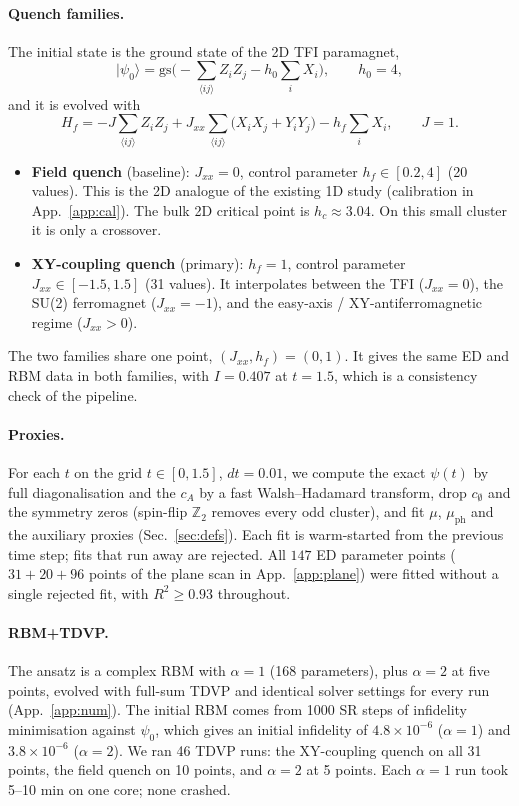 \documentclass[11pt,a4paper]{article}
\newcommand{\inff}{I}
\begin{document}
\paragraph{Quench families.}
The initial state is the ground state of the 2D TFI paramagnet,
\begin{equation}
  |\psi_0\rangle = \mathrm{gs}\Big(-\sum_{\langle ij\rangle} Z_iZ_j - h_0\sum_i X_i\Big),\qquad h_0=4,
\end{equation}
and it is evolved with
\begin{equation}
  H_f = -J\sum_{\langle ij\rangle} Z_iZ_j + J_{xx}\sum_{\langle ij\rangle}\big(X_iX_j+Y_iY_j\big) - h_f\sum_i X_i,\qquad J=1 .
\end{equation}
\begin{itemize}
  \item \textbf{Field quench} (baseline): $J_{xx}=0$, control parameter $h_f\in[0.2,4]$ (20 values).
    This is the 2D analogue of the existing 1D study (calibration in App.~\ref{app:cal}). The bulk 2D critical point is $h_c\approx3.04$.
    On this small cluster it is only a crossover.
  \item \textbf{XY-coupling quench} (primary): $h_f=1$, control parameter $J_{xx}\in[-1.5,1.5]$ (31 values).
    It interpolates between the TFI ($J_{xx}=0$), the SU(2) ferromagnet ($J_{xx}=-1$), and the
    easy-axis / XY-antiferromagnetic regime ($J_{xx}>0$).
\end{itemize}
The two families share one point, $(J_{xx},h_f)=(0,1)$. It gives the same ED and RBM data in both
families, with $\inff = 0.407$ at $t=1.5$, which is a consistency check of the pipeline.

\paragraph{Proxies.}
For each $t$ on the grid $t\in[0,1.5]$, $dt=0.01$, we compute the exact $\psi(t)$ by full diagonalisation and the
$c_A$ by a fast Walsh--Hadamard transform, drop $c_\emptyset$ and the symmetry zeros (spin-flip $\mathbb{Z}_2$ removes
every odd cluster), and fit $\mu$, $\mu_{\mathrm{ph}}$ and the auxiliary proxies (Sec.~\ref{sec:defs}). Each fit is
warm-started from the previous time step; fits that run away are rejected. All $147$ ED parameter points
($31+20+96$ points of the plane scan in App.~\ref{app:plane}) were fitted without a single rejected fit, with $R^2\ge0.93$ throughout.

\paragraph{RBM+TDVP.}
The ansatz is a complex RBM with $\alpha=1$ (168 parameters), plus $\alpha=2$ at five points, evolved with full-sum
TDVP and identical solver settings for every run (App.~\ref{app:num}). The initial RBM comes from 1000 SR steps of
infidelity minimisation against $\psi_0$, which gives an initial infidelity of $4.8\times10^{-6}$ ($\alpha=1$) and
$3.8\times10^{-6}$ ($\alpha=2$). We ran 46 TDVP runs: the XY-coupling quench on all 31 points, the field quench on 10 points, and $\alpha=2$ at 5 points.
Each $\alpha=1$ run took 5--10 min on one core; none crashed.
\end{document}
